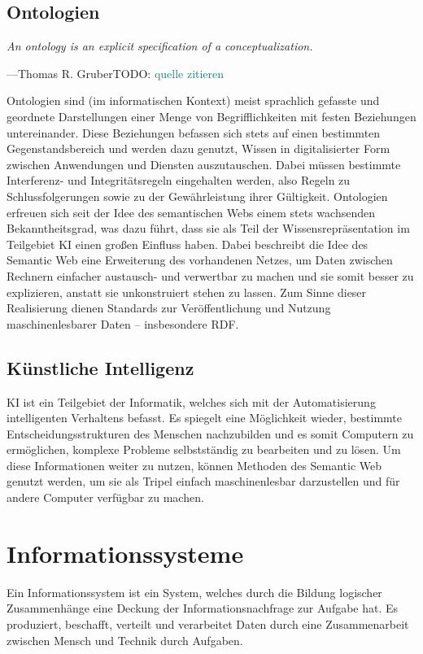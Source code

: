 \documentclass[headsepline,titlepage,ngerman,twoside,12pt]{report}
\newcommand\todo[1]{TODO: \textcolor{teal}{#1}}
\begin{document}
\subsection {Ontologien}
\label{sec:ontologien}
\setlength{}
\setlength\epigraphrule{0pt}

\epigraph{\itshape An ontology is an explicit specification of a conceptualization.}{---Thomas R. Gruber\todo{quelle zitieren}}

\noindent Ontologien sind (im informatischen Kontext) meist sprachlich gefasste und geordnete Darstellungen einer Menge von Begrifflichkeiten mit festen Beziehungen untereinander.
Diese Beziehungen befassen sich stets auf einen bestimmten Gegenstandsbereich und werden dazu genutzt, Wissen in digitalisierter Form zwischen Anwendungen und Diensten auszutauschen.
Dabei müssen bestimmte Interferenz- und Integritätsregeln eingehalten werden, also Regeln zu Schlussfolgerungen sowie zu der Gewährleistung ihrer Gültigkeit.
Ontologien erfreuen sich seit der Idee des semantischen Webs einem stets wachsenden Bekanntheitsgrad, was dazu führt, dass sie als Teil der Wissensrepräsentation im Teilgebiet \acs{KI} einen großen Einfluss haben.
Dabei beschreibt die Idee des Semantic Web eine Erweiterung des vorhandenen Netzes, um Daten zwischen Rechnern einfacher austausch- und verwertbar zu machen und sie somit besser zu explizieren, anstatt sie unkonstruiert stehen zu lassen.
Zum Sinne dieser Realisierung dienen Standards zur Veröffentlichung und Nutzung maschinenlesbarer Daten -- insbesondere \ac{RDF}.

\subsection{Künstliche Intelligenz}
\ac{KI} ist ein Teilgebiet der Informatik, welches sich mit der Automatisierung intelligenten Verhaltens befasst.
Es spiegelt eine Möglichkeit wieder, bestimmte Entscheidungsstrukturen des Menschen nachzubilden und es somit Computern zu ermöglichen, komplexe Probleme selbstständig zu bearbeiten und zu lösen.
Um diese Informationen weiter zu nutzen, können Methoden des Semantic Web genutzt werden, um sie als Tripel einfach maschinenlesbar darzustellen und für andere Computer verfügbar zu machen.

\section{Informationssysteme}
Ein Informationssystem ist ein System, welches durch die Bildung logischer Zusammenhänge eine Deckung der Informationsnachfrage zur Aufgabe hat.
Es produziert, beschafft, verteilt und verarbeitet Daten durch eine Zusammenarbeit zwischen Mensch und Technik durch Aufgaben.
\end{document}
